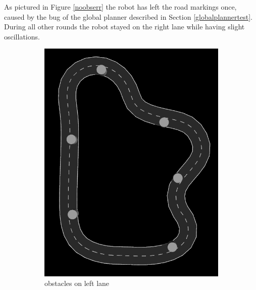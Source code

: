 As pictured in Figure \ref{noobserr} the robot has left the road markings once, caused by the bug of the global planner described in Section \ref{globalplannertest}. During all other rounds the robot stayed on the right lane while having slight oscillations.\\
\begin{figure}[H]
	\begin{subfigure}{.5\linewidth}
		\includegraphics[width=\textwidth]{Pictures/obstacle left final 2}
		\caption{obstacles on left lane}
	\end{subfigure}	
	\begin{subfigure}{.5\linewidth}

\end{subfigure}
\end{figure}
